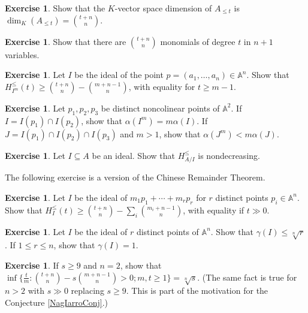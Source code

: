 \documentclass[11pt,twoside]{amsart}
\numberwithin{equation}{section}
\newcounter{xrcs}[section]
\theoremstyle{definition}
\newtheorem{exercise}[xrcs]{Exercise}
\begin{document}
\begin{exercise}\label{affstarsandbars}
Show that the ${K}$-vector space dimension of $A_{\leq t}$ is
$\dim_{K}(A_{\leq t})=\binom{t+n}{n}$.
\end{exercise}

\begin{exercise}\label{starsandbars}
Show that there are $\binom{t+n}{n}$ monomials of degree $t$ in $n+1$ variables.
\end{exercise}

\begin{exercise}\label{dimbound1pt}
Let $I$ be the ideal of the point $p=(a_1,\ldots,a_n)\in{\mathbb{A}^{{n}}}$. Show that 
$H^\leq_{I^m}(t)\geq\binom{t+n}{n}-\binom{m+n-1}{n}$,
with equality for $t\geq m-1$.
\end{exercise}

\begin{exercise}\label{exaffalpha} Let $p_1,p_2,p_3$ be distinct noncolinear points of ${\mathbb{A}^{{2}}}$.
If $I=I(p_1)\cap I(p_2)$, show that $\alpha(I^m)=m\alpha(I)$.
If $J=I(p_1)\cap I(p_2)\cap I(p_3)$ and $m>1$, show that 
$\alpha(J^m)<m\alpha(J)$.
\end{exercise}

\begin{exercise}\label{nondecrAff}
Let $I\subseteq A$ be an ideal.
Show that $H^{\leq}_{A/I}$ is nondecreasing.
\end{exercise}

The following exercise is a version of the Chinese Remainder Theorem.

\begin{exercise}\label{dimbound}
Let $I$ be the ideal of $m_1p_1+\cdots+m_rp_r$ for $r$ distinct points $p_i\in{\mathbb{A}^{{n}}}$. 
Show that $H^\leq_{I}(t)\geq\binom{t+n}{n}-\sum_i\binom{m_i+n-1}{n}$,
with equality if $t\gg0$.
\end{exercise}

\begin{exercise}\label{NagataBound}
Let $I$ be the ideal of $r$ distinct points of ${\mathbb{A}^{{n}}}$. Show that $\gamma(I)\leq \sqrt[n]{r}$. 
If $1\leq r\leq n$, show that $\gamma(I)=1$.
\end{exercise}

\begin{exercise}\label{NagConj}
If $s\geq9$ and $n=2$, 
show that $\inf\{\frac{t}{m}: \binom{t+n}{n}-s\binom{m+n-1}{n}>0; m,t\geq1\}=\sqrt[n]{s}$.
(The same fact is true for $n>2$ with $s\gg0$ replacing $s\ge 9$.
This is part of the motivation for the Conjecture \ref{NagIarroConj}.)
\end{exercise}
\end{document}
